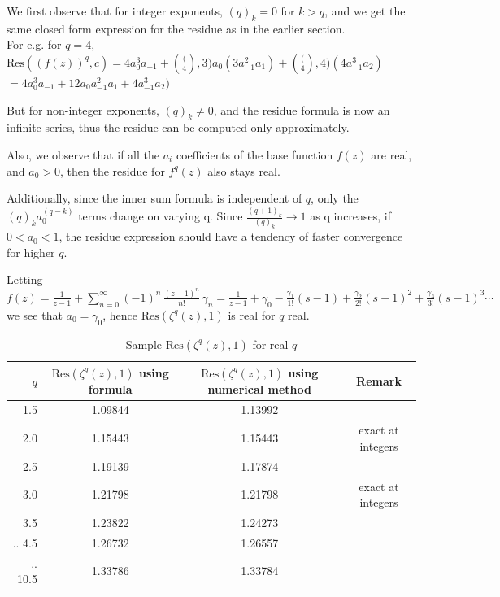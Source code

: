 \documentclass[a4paper,11pt,twoside]{amsart}
\newcommand\Res{\mathrm{Res}}
\begin{document}
We first observe that for integer exponents, $(q)_k = 0$ for $k>q$, and we get the same closed form expression for the residue as in the earlier section.\\
For e.g. for $q=4$, $\Res((f(z))^q,c) = 4 a_{0}^3 a_{-1} + \binom(4,3) a_0 (3 a_{-1}^2 a_1) + \binom(4,4) (4 a_{-1}^3 a_2)$
$=4 a_{0}^3 a_{-1} + 12 a_0 a_{-1}^2 a_1 + 4 a_{-1}^3 a_2)$

But for non-integer exponents, $(q)_k \ne 0$, and the residue formula is now an infinite series, thus the residue can be computed only approximately.

Also, we observe that if all the $a_i$ coefficients of the base function $f(z)$ are real, and $a_0 > 0$, then the residue for $f^{q}(z)$ also stays real. 

Additionally, since the inner sum formula is independent of $q$, only the $(q)_k a_{0}^{(q-k)}$ terms change on varying q. Since $\frac{(q+1)_k}{(q)_k} \to 1$ as q increases, if $0 < a_0 < 1$, the residue expression should have a tendency of faster convergence for higher $q$. 

Letting $f(z) = \frac{1}{z-1} + \sum\limits_{n=0}^{\infty} (-1)^n\,\frac{(z-1)^n}{n!}\, \gamma_n = \frac{1}{z-1} + \gamma_0 - \frac{\gamma_1}{1!}(s-1) + \frac{\gamma_2}{2!}(s-1)^2 + \frac{\gamma_3}{3!}(s-1)^3 \cdots$ we see that $a_0 = \gamma_0$, hence $\Res(\zeta^{q}(z),1)$ is real for $q$ real.

\begin{table}[H]
  \begin{center}
    \caption{Sample $\Res(\zeta^{q}(z),1)$ for real $q$}
    \label{tab:table3}
    \begin{tabular}{r|c|c|c} 
      $q$ & $\Res(\zeta^{q}(z),1)$ using formula & $\Res(\zeta^{q}(z),1)$ using numerical method & Remark\\
      \hline
      1.5 & 1.09844 & 1.13992\\
      2.0 & 1.15443 & 1.15443 & exact at integers\\
      2.5 & 1.19139 & 1.17874\\
      3.0 & 1.21798 & 1.21798 & exact at integers\\
      3.5 & 1.23822 & 1.24273\\
      ..
      4.5 & 1.26732 & 1.26557 \\
      ..
      10.5 & 1.33786 & 1.33784 \\ 
    \end{tabular}
  \end{center}
\end{table}
\end{document}
